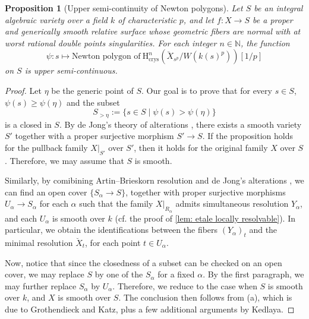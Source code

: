 \documentclass[11pt, letterpaper]{amsart}
\theoremstyle{plain}
\newtheorem{proposition}[theorem]{Proposition}
\theoremstyle{definition}
\newcommand{\<}{\langle}
\renewcommand{\>}{\rangle}
\newcommand{\crys}{\mathrm{crys}}
\begin{document}
\begin{proposition}[Upper semi-continuity of Newton polygons]
	\label{prop:var_of_Netwon}
	Let $S$ be an integral algebraic variety over a field $k$ of characteristic $p$, and let $f : X \to S$ be a proper and generically smooth relative surface whose geometric fibers are normal with at worst rational double points singularities.
	For each integer $n\in \mathbb{N}$, the function
    \begin{equation}
        \psi : s \longmapsto \text{Newton polygon of}~\mathrm{H}^n_\crys(\breve{X}_{s^p} / W(k(s)^p))[1/p]
    \end{equation} 
    on $S$ is upper semi-continuous.
\end{proposition}
\begin{proof}
        Let $\eta$ be the generic point of $S$. Our goal is to prove that for every $s \in S$, $\psi(s) \ge \psi(\eta)$ and the subset 
        \begin{equation}
            \label{eqn: jumping locus}
            S_{> \eta} := \{ s \in S \mid \psi(s) > \psi(\eta) \}
        \end{equation}
        is a closed in $S$. By de Jong's theory of alterations \cite{deJongAlt}, there exists a smooth variety $S'$ together with a proper surjective morphism $S' \to S$. If the proposition holds for the pullback family $X|_{S'}$ over $S'$, then it holds for the original family $X$ over $S$. Therefore, we may assume that $S$ is smooth. 

        
	Similarly, by comibining Artin--Brieskorn resolution \cite{Artin-Res} and de Jong's alterations \cite{deJongAlt}, we can find an open cover $\{S_\alpha\to S\}$, together with proper surjective morphisms $U_\alpha \to S_\alpha$ for each $\alpha$ such that the family $X|_{R_\alpha}$ admits simultaneous resolution $Y_\alpha$, and each $U_\alpha$ is smooth over $k$ (cf. the proof of \cref{lem: etale locally resolvable}).
	In particular, we obtain the identifications between the fibers $(Y_\alpha)_t$ and the minimal resolution $\breve{X}_t$, for each point $t\in U_\alpha$.
    
	
	Now, notice that since the closedness of a subset can be checked on an open cover, we may replace $S$ by one of the $S_\alpha$ for a fixed $\alpha$. 
        By the first paragraph, we may further replace 
    $S_\alpha$ by $U_\alpha$. 
    Therefore, we reduce to the case when $S$ is smooth over $k$, and $X$ is smooth over $S$. 
    The conclusion then follows from \cite[Thm.\ 3.12]{Ked22}(a), which is due to Grothendieck and Katz, plus a few additional arguments by Kedlaya. 
\end{proof}
\end{document}
